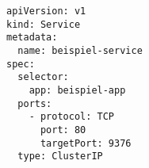 \begin{verbatim}
apiVersion: v1
kind: Service
metadata:
  name: beispiel-service
spec:
  selector:
    app: beispiel-app
  ports:
    - protocol: TCP
      port: 80
      targetPort: 9376
  type: ClusterIP
\end{verbatim}